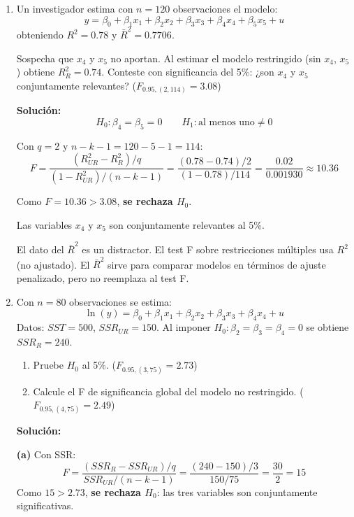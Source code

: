 \documentclass[11pt,a4paper]{article}
\begin{document}
\begin{enumerate}
    \item 
Un investigador estima con $n=120$ observaciones el modelo:
\[
y = \beta_0 + \beta_1 x_1 + \beta_2 x_2 + \beta_3 x_3 + \beta_4 x_4 + \beta_5 x_5 + u
\]
obteniendo $R^2 = 0.78$ y $\bar{R}^2 = 0.7706$.

Sospecha que $x_4$ y $x_5$ no aportan. Al estimar el modelo restringido (sin $x_4$, $x_5$) obtiene $R^2_R = 0.74$. Conteste con significancia del 5\%: ¿son $x_4$ y $x_5$ conjuntamente relevantes? ($F_{0.95,(2,114)}=3.08$)


\textbf{Solución:}
\[
H_0: \beta_4 = \beta_5 = 0 \qquad H_1: \text{al menos uno} \neq 0
\]

Con $q=2$ y $n-k-1 = 120-5-1 = 114$:
\[
F = \frac{(R^2_{UR}-R^2_R)/q}{(1-R^2_{UR})/(n-k-1)} = \frac{(0.78-0.74)/2}{(1-0.78)/114} = \frac{0.02}{0.001930} \approx 10.36
\]

Como $F = 10.36 > 3.08$, \textbf{se rechaza $H_0$}.

\begin{conclusion}
Las variables $x_4$ y $x_5$ son conjuntamente relevantes al 5\%.
\end{conclusion}

\begin{nota}
El dato del $\bar{R}^2$ es un distractor. El test F sobre restricciones múltiples usa $R^2$ (no ajustado). El $\bar{R}^2$ sirve para comparar modelos en términos de ajuste penalizado, pero no reemplaza al test F.
\end{nota}


\item Con $n=80$ observaciones se estima:
\[
\ln(y) = \beta_0 + \beta_1 x_1 + \beta_2 x_2 + \beta_3 x_3 + \beta_4 x_4 + u
\]
Datos: $SST = 500$, $SSR_{UR} = 150$. Al imponer $H_0: \beta_2 = \beta_3 = \beta_4 = 0$ se obtiene $SSR_R = 240$.
\begin{enumerate}
    \item[(a)] Pruebe $H_0$ al 5\%. ($F_{0.95,(3,75)}=2.73$)
    \item[(b)] Calcule el F de significancia global del modelo no restringido. ($F_{0.95,(4,75)}=2.49$)
\end{enumerate}

\textbf{Solución:}

\textbf{(a)} Con SSR:
\[
F = \frac{(SSR_R - SSR_{UR})/q}{SSR_{UR}/(n-k-1)} = \frac{(240-150)/3}{150/75} = \frac{30}{2} = 15
\]
Como $15 > 2.73$, \textbf{se rechaza $H_0$}: las tres variables son conjuntamente significativas.


\end{enumerate}
\end{document}
